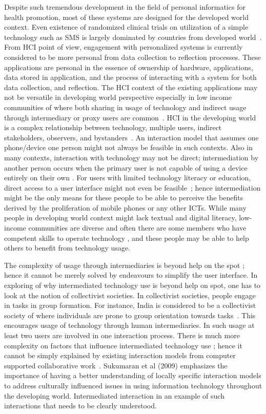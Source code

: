 Despite such tremendous development in the field of personal informatics for health promotion, most of these systems are designed for the developed world context. Even existence of randomized clinical trials on utilization of a simple technology such as SMS is largely dominated by countries from developed world~\citep{cole2010text}. From HCI point of view, engagement with personalized systems is currently considered to be more personal from data collection to reflection processes. These applications are personal in the essence of ownership of hardware, applications, data stored in application, and the process of interacting with a system for both data collection, and reflection. The HCI context of the existing applications may not be versatile in developing world perspective especially in low income communities of where  both sharing in usage of technology and indirect usage through intermediary or proxy users are common~\citep{kaplan2006can,sambasivan2010}. HCI in the developing world is a complex relationship between technology, multiple users, indirect stakeholders, observers, and bystanders~\citep{parikh2006}. An interaction model that assumes one phone/device one person might not always be feasible in such contexts. Also in many contexts, interaction with technology may not be direct; intermediation by another person occurs when the primary user is not capable of using a device entirely on their own \citep{sambasivan2010}. For users with limited technology literacy or education, direct access to a user interface might not even be feasible~\citep{parikh2006}; hence intermediation might be the only means for these people to be able to perceive the benefits derived by the proliferation of mobile phones or any other ICTs. While many people in developing world context might lack textual and digital literacy, low-income communities are diverse and often there are some members who have competent skills to operate technology \citep{sambasivan2010}, and these people may be able to help others to benefit from technology usage.

The complexity of usage through intermediaries is beyond help on the spot \citep{sambasivan2010}; hence it cannot be merely solved by endeavours to simplify the user interface. In exploring of why intermediated technology use is beyond help on spot, one has to look at the notion of collectivist societies. In collectivist societies, people engage in tasks in group formation. For instance, India is considered to be a collectivist society of where individuals are prone to group orientation towards tasks~\citep{parikh2006}. This encourages usage of technology through human intermediaries. In such usage at least two users are involved in one interaction process. There is much more complexity on factors that influence intermediated technology use ; hence it cannot be simply explained by existing interaction models from computer supported collaborative work~\citep{parikh2006}. Sukumaran et al (2009) emphasizes the importance of having a better understanding of locally specific interaction models to address culturally influenced issues in using information technology throughout the developing world. Intermediated interaction in an example of such interactions that needs to be clearly understood.

